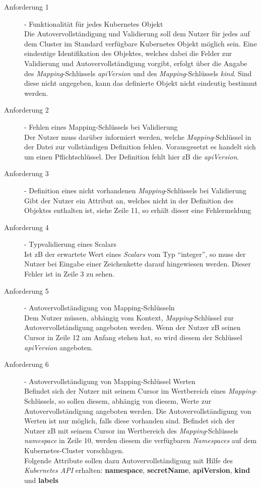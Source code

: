 \begin{description}
      \item[Anforderung 1]{- Funktionalität für jedes Kubernetes Objekt\\}
            Die Autovervollständigung und Validierung soll dem Nutzer für jedes auf dem Cluster im Standard verfügbare Kubernetes Objekt möglich sein.
            Eine eindeutige Identifikation des Objektes, welches dabei die Felder zur Validierung und Autovervollständigung vorgibt, erfolgt über
            die Angabe des \textit{Mapping}-Schlüssels \textit{apiVersion} und des \textit{Mapping}-Schlüssels \textit{kind}. Sind diese nicht angegeben, kann das definierte Objekt nicht
            eindeutig bestimmt werden.
      \item[Anforderung 2]{- Fehlen eines Mapping-Schlüssels bei Validierung\\}
            Der Nutzer muss darüber informiert werden, welche \textit{Mapping}-Schlüssel in der Datei zur vollständigen Definition fehlen.
            Vorausgesetzt es handelt sich um einen Pflichtschlüssel.
            Der Definition fehlt hier \ac{zB} die \textit{apiVersion}.
      \item[Anforderung 3]{- Definition eines nicht vorhandenen \textit{Mapping}-Schlüssels bei Validierung\\}
            Gibt der Nutzer ein Attribut an, welches nicht in der Definition des Objektes enthalten ist, siehe Zeile 11, so erhält dieser eine Fehlermeldung
      \item[Anforderung 4]{- Typvalidierung eines Scalars\\}
            Ist \ac{zB} der erwartete Wert eines \textit{Scalars} vom Typ ``integer'',
            so muss der Nutzer bei Eingabe einer Zeichenkette darauf hingewiesen werden. Dieser Fehler ist in Zeile 3 zu sehen.
      \item[Anforderung 5]{- Autovervollständigung von Mapping-Schlüsseln\\}
            Dem Nutzer müssen, abhängig vom Kontext, \textit{Mapping}-Schlüssel zur Autovervollständigung angeboten werden.
            Wenn der Nutzer \ac{zB} seinen Cursor in Zeile 12 am Anfang stehen hat, so wird diesem der Schlüssel \textit{apiVersion} angeboten.
      \item[Anforderung 6]{- Autovervollständigung von Mapping-Schlüssel Werten\\}
            Befindet sich der Nutzer mit seinem Cursor im Wertbereich eines \textit{Mapping}-Schlüssels, so sollen diesem, abhängig von diesem, Werte zur Autovervollständigung
            angeboten werden. Die Autovervollständigung von Werten ist nur möglich, falls diese vorhanden sind.
            Befindet sich der Nutzer \ac{zB} mit seinem Cursor im Wertbereich des \textit{Mapping}-Schlüssels \textit{namespace} in Zeile 10,
            werden diesem die verfügbaren \textit{Namespaces} auf dem Kubernetes-Cluster vorschlagen.
            \\
            Folgende Attribute sollen dazu Autovervollständigung mit Hilfe des \textit{Kubernetes API} erhalten:
            \textbf{namespace}, \textbf{secretName}, \textbf{apiVersion}, \textbf{kind} und \textbf{labels}
\end{description}

